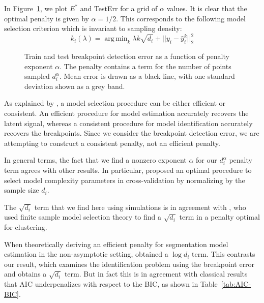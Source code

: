 \documentclass{jsfds} %
\newcommand{\fig}[3][H]{
  \begin{figure}[#1]
    \hskip -1cm
    
    \caption{#3}
    \label{fig:#2}
  \end{figure}
}
\DeclareMathOperator*{\argmin}{arg\,min}
\begin{document}
In Figure~\ref{fig:variable-density-error-alpha}, we plot $E^*$ and
TestErr for a grid of $\alpha$ values.
It is clear that the optimal penalty is given by $\alpha=1/2$. This
corresponds to the following model selection criterion which is
invariant to sampling density:
\begin{equation}
  \label{eq:var_dens_opt_pen}
  k_i(\lambda) = \argmin_k \lambda k \sqrt{d_i}+||y_i-\hat y_i^k||^2_2
\end{equation}

\fig{variable-density-error-alpha}{Train and test breakpoint detection
  error as a function of penalty exponent $\alpha$. The penalty
  contains a term for the number of points sampled $d_i^\alpha$. Mean
  error is drawn as a black line, with one standard deviation shown as
  a grey band.}

\newpage

As explained by \citet{sylvain-survey}, a model selection procedure
can be either efficient or consistent. An efficient procedure for
model estimation accurately recovers the latent signal, whereas a
consistent procedure for model identification accurately recovers the
breakpoints. Since we consider the breakpoint detection error, we are
attempting to construct a consistent penalty, not an efficient
penalty.

In general terms, the fact that we find a nonzero exponent $\alpha$
for our $d_i^\alpha$ penalty term agrees with other results. In
particular, \citet{vfold} proposed an optimal procedure to select model
complexity parameters in cross-validation by normalizing by the sample
size $d_i$. 

The $\sqrt{d_i}$ term that we find here using simulations is in
agreement with \citet{aurelie}, who used finite sample model selection
theory to find a $\sqrt{d_i}$ term in a penalty optimal for
clustering.

When theoretically deriving an efficient penalty for segmentation
model estimation in the non-asymptotic setting, \citet{lebarbier}
obtained a $\log d_i$ term. This contrasts our result, which examines
the identification problem using the breakpoint error and obtains a
$\sqrt{d_i}$ term. But in fact this is in agreement with classical
results that AIC underpenalizes with respect to the BIC, as shown in
Table~\ref{tab:AIC-BIC}.
\end{document}
